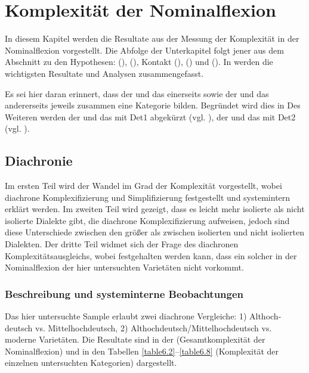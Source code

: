 \chapter{Komplexität der Nominalflexion}\label{6}

In diesem Kapitel werden die Resultate aus der Messung der Komplexität in der Nominalflexion vorgestellt. Die Abfolge der Unterkapitel folgt jener aus dem Abschnitt  zu den Hypothesen:  (),  (), Kontakt (),  () und  (). In  werden die wichtigsten Resultate und Analysen zusammengefasst.

Es sei hier daran erinnert, dass der  und das  einerseits sowie der  und das  andererseits jeweils zusammen eine Kategorie bilden. Begründet wird dies in  Des Weiteren werden der  und das  mit Det1 abgekürzt (vgl. ), der  und das  mit Det2 (vgl. ).

\section{Diachronie}\label{6.1}

Im ersten Teil wird der Wandel im Grad der Komplexität vorgestellt, wobei diachrone Komplexifizierung und Simplifizierung festgestellt und systemintern erklärt werden. Im zweiten Teil wird gezeigt, dass es leicht mehr isolierte als nicht isolierte Dialekte gibt, die diachrone Komplexifizierung aufweisen, jedoch sind diese Unterschiede zwischen den  größer als zwischen isolierten und nicht isolierten Dialekten. Der dritte Teil widmet sich der Frage des diachronen Komplexitätsausgleichs, wobei festgehalten werden kann, dass ein solcher in der Nominalflexion der hier untersuchten Varietäten nicht vorkommt.

\subsection{Beschreibung und systeminterne Beobachtungen}\label{6.1.1}

Das hier untersuchte Sample erlaubt zwei diachrone Vergleiche: 1) Althoch-\linebreak deutsch vs. Mittelhochdeutsch, 2) Althochdeutsch/Mittelhochdeutsch vs. moderne Varietäten. Die Resultate sind in der  (Gesamtkomplexität der Nominalflexion) und in den Tabellen \ref{table6.2}–\ref{table6.8} (Komplexität der einzelnen untersuchten Kategorien) dargestellt.

